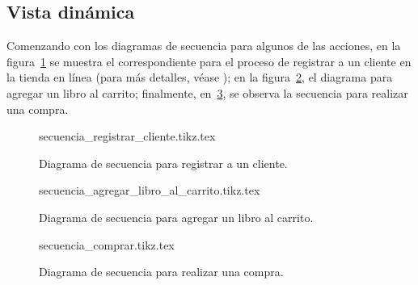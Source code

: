 \subsection{Vista dinámica}
Comenzando con los diagramas de secuencia para algunos de las acciones, en la
figura~\ref{lib_fig:secuencia_registrar_cliente} se muestra el correspondiente
para el proceso de registrar a un cliente en la tienda en línea (para más
detalles, véase ); en la
figura~\ref{lib_fig:secuencia_agregar_libro_al_carrito}, el diagrama para
agregar un libro al carrito; finalmente, en~\ref{lib_fig:secuencia_comprar},
se observa la secuencia para realizar una compra.

\begin{figure}
  \begin{center}
    {secuencia_registrar_cliente.tikz.tex}
    \caption{Diagrama de secuencia para registrar a un cliente.}
    \label{lib_fig:secuencia_registrar_cliente}
  \end{center}
\end{figure}

\begin{figure}
  \begin{center}
    {secuencia_agregar_libro_al_carrito.tikz.tex}
    \caption{Diagrama de secuencia para agregar un libro al carrito.}
    \label{lib_fig:secuencia_agregar_libro_al_carrito}
  \end{center}
\end{figure}

\begin{figure}
  \begin{center}
    {secuencia_comprar.tikz.tex}
    \caption{Diagrama de secuencia para realizar una compra.}
    \label{lib_fig:secuencia_comprar}
  \end{center}
\end{figure}
